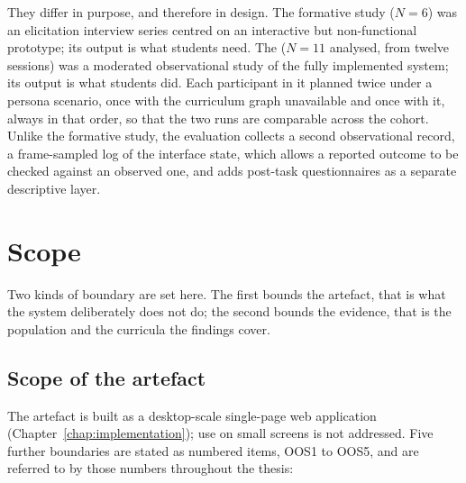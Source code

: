They differ in purpose, and therefore in design. The formative study ($N=6$) was an elicitation interview series centred on an interactive but non-functional prototype; its output is what students need. The  ($N=11$ analysed, from twelve sessions) was a moderated observational study of the fully implemented system; its output is what students did. Each participant in it planned twice under a persona scenario, once with the curriculum graph unavailable and once with it, always in that order, so that the two runs are comparable across the cohort. Unlike the formative study, the evaluation collects a second observational record, a frame-sampled log of the interface state, which allows a reported outcome to be checked against an observed one, and adds post-task questionnaires as a separate descriptive layer.


\section{Scope}
\label{sec:overall-scope}

Two kinds of boundary are set here. The first bounds the artefact, that is what the system deliberately does not do; the second bounds the evidence, that is the population and the curricula the findings cover.

\subsection*{Scope of the artefact}

The artefact is built as a desktop-scale single-page web application (Chapter~\ref{chap:implementation}); use on small screens is not addressed. Five further boundaries are stated as numbered  items, OOS1 to OOS5, and are referred to by those numbers throughout the thesis:

